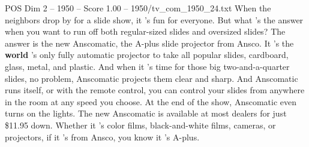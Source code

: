 \begin{textsample}{POS Dim 2 – 1950 – Score 1.00 – 1950/tv\_com\_1950\_24.txt}  \label{ex:f2_pos_020}
When the neighbors drop by for a slide show, it 's fun for everyone.
But what 's the answer when you want to run off both regular-sized slides and oversized slides?
The answer is the new Anscomatic, the A-plus slide projector from Ansco.
It 's the \textbf{world} 's only fully automatic projector to take all popular slides, cardboard, glass, metal, and plastic.
And when it 's time for those big two-and-a-quarter slides, no problem, Anscomatic projects them clear and sharp.
And Anscomatic runs itself, or with the remote control, you can control your slides from anywhere in the room at any speed you choose.
At the end of the show, Anscomatic even turns on the lights.
The new Anscomatic is available at most dealers for just \$11.95 down.
Whether it 's color films, black-and-white films, cameras, or projectors, if it 's from Ansco, you know it 's A-plus.

\end{textsample}
